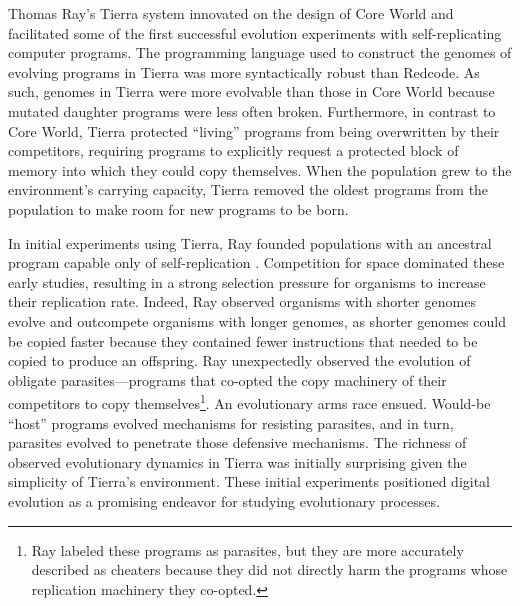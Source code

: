Thomas Ray's Tierra system \citep{ray_approach_1991} innovated on the design of Core World and facilitated some of the first successful evolution experiments with self-replicating computer programs.
The programming language used to construct the genomes of evolving programs in Tierra was more syntactically robust than Redcode.
As such, genomes in Tierra were more evolvable than those in Core World because mutated daughter programs were less often broken. 
Furthermore, in contrast to Core World, Tierra protected ``living'' programs from being overwritten by their competitors, requiring programs to explicitly request a protected block of memory into which they could copy themselves. 
When the population grew to the environment's carrying capacity, Tierra removed the oldest programs from the population to make room for new programs to be born. 

In initial experiments using Tierra, Ray founded populations with an ancestral program capable only of self-replication \citep{ray_approach_1991}.
Competition for space dominated these early studies, resulting in a strong selection pressure for organisms to increase their replication rate. 
Indeed, Ray observed organisms with shorter genomes evolve and outcompete organisms with longer genomes, as shorter genomes could be copied faster because they contained fewer instructions that needed to be copied to produce an offspring.
Ray unexpectedly observed the evolution of obligate parasites---programs that co-opted the copy machinery of their competitors to copy themselves\footnote{
Ray labeled these programs as parasites, but they are more accurately described as cheaters because they did not directly harm the programs whose replication machinery they co-opted.
}. 
An evolutionary arms race ensued.
Would-be ``host'' programs evolved mechanisms for resisting parasites, and in turn, parasites evolved to penetrate those defensive mechanisms.
The richness of observed evolutionary dynamics in Tierra was initially surprising given the simplicity of Tierra's environment.
These initial experiments positioned digital evolution as a promising endeavor for studying evolutionary processes. 

